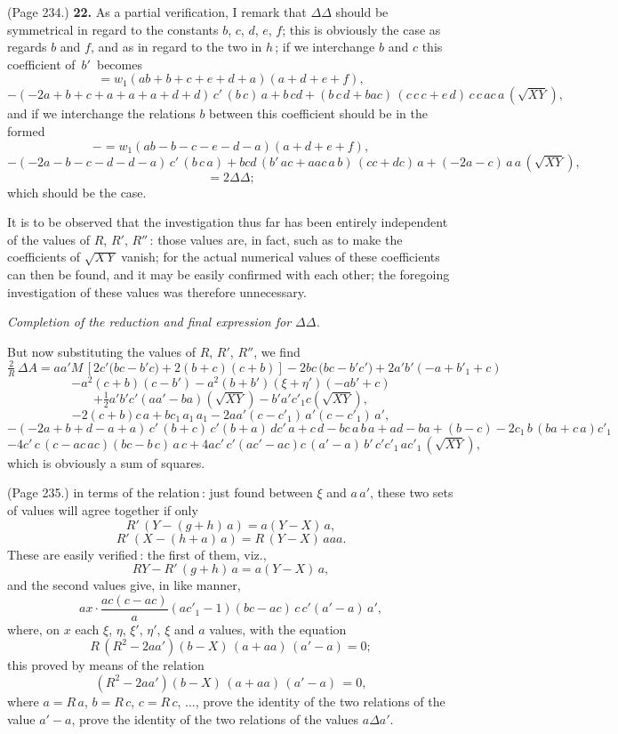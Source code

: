\documentclass[11pt,a4paper]{book}
\begin{document}
\medskip

\noindent (Page 234.) \textbf{22.} As a partial verification, I remark that $\Delta\Delta$ should be symmetrical in regard to the constants $b$, $c$, $d$, $e$, $f$; this is obviously the case as regards $b$ and $f$, and as in regard to the two in $h$\,; if we interchange $b$ and $c$ this coefficient of $\,b'\,$ becomes
\[
= w_1(a b + b + c + e + d + a)(a + d + e + f),
\]
\[
- (- 2 a + b + c + a + a + a + d + d)\,c'\,(b\,c)\,a + b\,c d + (b\,c\,d + b a c)\,(c\,c\,c + e\,d)\,c\,c\,a c\,a\,(\sqrt{X Y}),
\]
and if we interchange the relations $b$ between this coefficient should be in the formed
\[
- = w_1(a b - b - c - e - d - a)(a + d + e + f),
\]
\[
- (- 2 a - b - c - d - d - a)\,c'\,(b\,c\,a) + b c d\,(b'\,a c + a a c\,a\,b)\,(c c + d c)\,a + (- 2 a - c)\,a\,a\,(\sqrt{X Y}),
\]
\[
= 2\Delta\Delta;
\]
which should be the case.

\medskip

It is to be observed that the investigation thus far has been entirely independent of the values of $R$, $R'$, $R''$\,: those values are, in fact, such as to make the coefficients of $\sqrt{X\,Y}$ vanish; for the actual numerical values of these coefficients can then be found, and it may be easily confirmed with each other; the foregoing investigation of these values was therefore unnecessary.

\medskip

\noindent\textit{Completion of the reduction and final expression for $\Delta\Delta$.}

\medskip

But now substituting the values of $R$, $R'$, $R''$, we find
\[
\tfrac{2}{R}\,\Delta A = a a' M\,[2 c'\big(b c - b' c\big) + 2(b + c)(c + b)] - 2 b c\,(b c - b' c'\big) + 2 a' b'(- a + b'_1 + c)
\]
\[
- a^2(c + b)(c - b') - a^2(b + b')(\xi + \eta')(- a b' + c)
\]
\[
+ \tfrac{1}{2} a' b' c'(a a' - b a)(\sqrt{X Y}) - b' a' c'_1 c (\sqrt{X Y}),
\]
\[
- 2(c + b) c\,a + b c_1\,a_1\,a_1 - 2 a a'(c - c'_1)\,a' (c - c'_1)\,a',
\]
\[
- (-2 a + b + d - a + a)\,c'\,(b + c)\,c' (b + a)\,d c'\,a + c\,d - b c\,a\,b\,a + ad - ba + (b-c) - 2c_1\,b\,(b a + c\,a)c'_1
\]
\[
- 4 c'\,c\,(c - a c\,a c)(b c - b\,c)\,a\,c + 4 a c'\,c' (a c' - a c) c\,(a' - a)\,b'\,c' c'_1\,a c'_1\,(\sqrt{X Y}),
\]
which is obviously a sum of squares.

\medskip

\noindent (Page 235.) in terms of the relation\,: just found between $\xi$ and $a\,a'$, these two sets of values will agree together if only
\[
R'\,(Y - (g + h)\,a) = a (Y - X)\,a,
\]
\[
R'\,(X - (h + a)\,a) = R\,(Y - X)\,a a a.
\]
These are easily verified\,: the first of them, viz.,
\[
R Y - R'\,(g + h)\,a = a (Y - X)\,a,
\]
and the second values give, in like manner,
\[
a x \cdot \frac{a c (c - a c)}{a} (a c'_1 - 1) (b c - a c)\,c\,c' (a' - a)\,a',
\]
where, on $x$ each $\xi$, $\eta$, $\xi'$, $\eta'$, $\xi$ and $a$ values, with the equation
\[
R\,(R^2 - 2 a a')(b - X)\,(a + a a)\,(a' - a) = 0;
\]
this proved by means of the relation
\[
( R^2 - 2 a a')(b - X)\,(a + a a)\,(a' - a)\,= 0,
\]
where $a = R\,a$, $b = R\,c$, $c = R\,c$, $\ldots$, prove the identity of the two relations of the value $a' - a$, prove the identity of the two relations of the values $a\Delta a'$.
\end{document}
